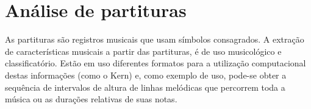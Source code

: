 \section{Análise de partituras}
As partituras são registros musicais que usam símbolos consagrados. A extração de características musicais a partir das partituras, é de uso musicológico e classificatório. Estão em uso diferentes formatos para a utilização computacional destas informações (como o Kern) e, como exemplo de uso, pode-se obter a sequência de intervalos de altura de linhas melódicas que percorrem toda a música ou as durações relativas de suas notas.

